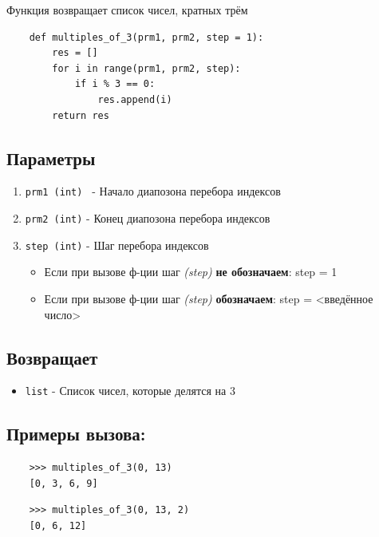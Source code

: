 \documentclass{article}
\begin{document}
    Функция возвращает список чисел, кратных трём
    
    \begin{verbatim}
    def multiples_of_3(prm1, prm2, step = 1):
        res = []
        for i in range(prm1, prm2, step):
            if i % 3 == 0:
                res.append(i)
        return res
    \end{verbatim}
    
    \subsection*{Параметры}
        \begin{enumerate}
            \item \texttt{prm1 (int) } - Начало диапозона перебора индексов 
            \item \texttt{prm2 (int)} - Конец диапозона перебора индексов
            \item \texttt{step (int)} -  Шаг перебора индексов
                \begin{itemize}
                    \item Если при вызове ф-ции шаг \textit{(step)} \textbf{не обозначаем}: step = 1
                    \item Если при вызове ф-ции шаг  \textit{(step)} \textbf{обозначаем}: step = <введённое число>
                \end{itemize}
        \end{enumerate}
        
        \subsection*{Возвращает}
        \begin{itemize}
            \item \texttt{list} - Список чисел, которые делятся на 3  
        \end{itemize}
    
    
    \subsection*{Примеры вызова:}
        \begin{verbatim}
    >>> multiples_of_3(0, 13) 
    [0, 3, 6, 9]
        \end{verbatim}

        \begin{verbatim}
    >>> multiples_of_3(0, 13, 2) 
    [0, 6, 12]
        \end{verbatim}
\end{document}
